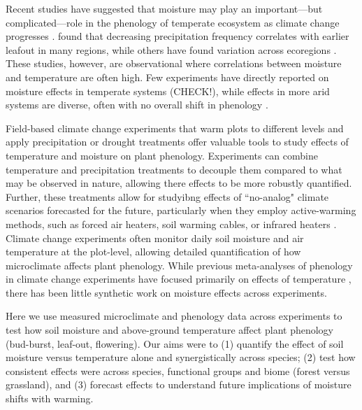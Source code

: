 \documentclass{article}
\begin{document}
\par Recent studies have suggested that moisture may play an  important---but complicated---role in the phenology of temperate ecosystem as climate change progresses \citep[e.g.,][]{seyed2018,wang2022}. \citet{wang2022} found that decreasing precipitation frequency correlates with earlier leafout in many regions, while others have found variation across ecoregions \citep{seyed2018}. These studies, however, are observational where correlations between moisture and temperature are often high. Few experiments have directly reported on moisture effects in temperate systems (CHECK!), while effects in more arid systems are diverse, often with no overall shift in phenology \citep[e.g.,][]{sherry2007,howell2020}.

\par Field-based climate change experiments that warm plots to different levels and apply precipitation or drought treatments offer valuable tools to study effects of temperature and moisture on plant phenology. Experiments can combine temperature and precipitation treatments to decouple them compared to what may be observed in nature, allowing there effects to be more robustly quantified. Further, these treatments allow for studyibng effects of ``no-analog" climate scenarios forecasted for the future, particularly when they employ active-warming methods, such as forced air heaters, soil warming cables, or infrared heaters \citep{shaver2000,williams2007b,aronson2009}. Climate change experiments often monitor daily soil moisture and air temperature at the plot-level, allowing detailed quantification of how microclimate affects plant phenology. While previous meta-analyses of phenology in climate change experiments have focused primarily on effects of temperature \citep[e.g.,][]{wolkovich2012}, there has been little synthetic work on moisture effects across experiments. 
\par Here we use measured microclimate and phenology data across experiments to test how soil moisture and above-ground temperature affect plant phenology (bud-burst, leaf-out, flowering). Our aims were to (1) quantify the effect of soil moisture versus temperature alone and synergistically across species; (2) test how consistent effects were across species, functional groups and biome (forest versus grassland), and (3) forecast effects to understand future implications of moisture shifts with warming. 
\end{document}
